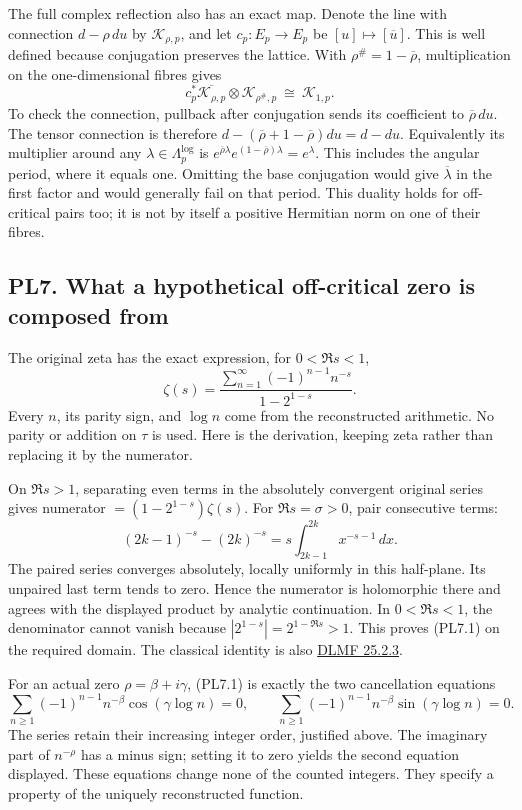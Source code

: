 The full complex reflection also has an exact map. Denote the line with
connection \(d-\rho\,du\) by \(\mathscr K_{\rho,p}\), and let
\(c_p:E_p\to E_p\) be \([u]\mapsto[\overline u]\). This is well defined
because conjugation preserves the lattice. With
\(\rho^\#=1-\overline\rho\), multiplication on the one-dimensional
fibres gives \[
c_p^*\overline{\mathscr K_{\rho,p}}\otimes\mathscr K_{\rho^\#,p}
\ \cong\ \mathscr K_{1,p}.
\tag{PL6.8}
\] To check the connection, pullback after conjugation sends its
coefficient to \(\overline\rho\,du\). The tensor connection is therefore
\(d-(\overline\rho+1-\overline\rho)du=d-du\). Equivalently its
multiplier around any \(\lambda\in\Lambda_p^{\log}\) is
\(e^{\overline\rho\lambda}e^{(1-\overline\rho)\lambda}=e^\lambda\). This
includes the angular period, where it equals one. Omitting the base
conjugation would give \(\overline\lambda\) in the first factor and
would generally fail on that period. This duality holds for off-critical
pairs too; it is not by itself a positive Hermitian norm on one of their
fibres.

\subsection{PL7. What a hypothetical off-critical zero is composed
from}\label{pl7.-what-a-hypothetical-off-critical-zero-is-composed-from}

The original zeta has the exact expression, for \(0<\Re s<1\), \[
\zeta(s)=\frac{\displaystyle\sum_{n=1}^{\infty}(-1)^{n-1}n^{-s}}
{1-2^{1-s}}.
\tag{PL7.1}
\] Every \(n\), its parity sign, and \(\log n\) come from the
reconstructed arithmetic. No parity or addition on \(\tau\) is used.
Here is the derivation, keeping zeta rather than replacing it by the
numerator.

On \(\Re s>1\), separating even terms in the absolutely convergent
original series gives numerator \(=(1-2^{1-s})\zeta(s)\). For
\(\Re s=\sigma>0\), pair consecutive terms: \[
(2k-1)^{-s}-(2k)^{-s}
=s\int_{2k-1}^{2k}x^{-s-1}\,dx.
\] The paired series converges absolutely, locally uniformly in this
half-plane. Its unpaired last term tends to zero. Hence the numerator is
holomorphic there and agrees with the displayed product by analytic
continuation. In \(0<\Re s<1\), the denominator cannot vanish because
\(|2^{1-s}|=2^{1-\Re s}>1\). This proves (PL7.1) on the required domain.
The classical identity is also
\href{https://dlmf.nist.gov/25.2\#E3}{DLMF 25.2.3}.

For an actual zero \(\rho=\beta+i\gamma\), (PL7.1) is exactly the two
cancellation equations \[
\sum_{n\ge1}(-1)^{n-1}n^{-\beta}\cos(\gamma\log n)=0,\qquad
\sum_{n\ge1}(-1)^{n-1}n^{-\beta}\sin(\gamma\log n)=0.
\tag{PL7.2}
\] The series retain their increasing integer order, justified above.
The imaginary part of \(n^{-\rho}\) has a minus sign; setting it to zero
yields the second equation displayed. These equations change none of the
counted integers. They specify a property of the uniquely reconstructed
function.

